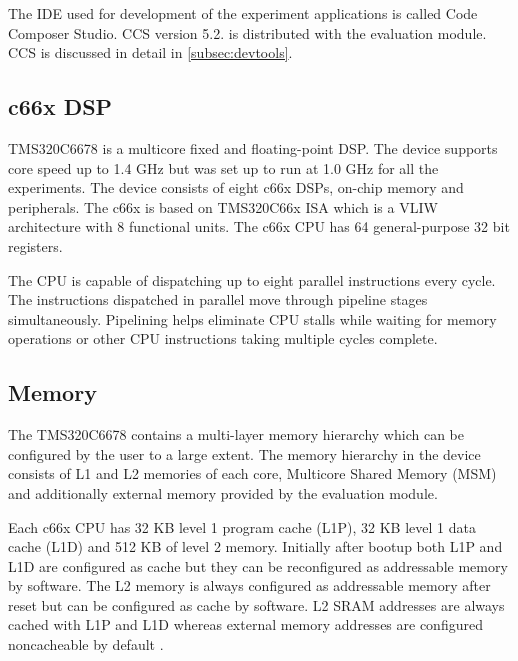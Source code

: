 The IDE used for development of the experiment applications is called Code Composer Studio. CCS version 5.2. is distributed with the evaluation module. CCS is discussed in detail in \ref{subsec:devtools}. 

\subsection{c66x DSP}
\label{subsec:c66x}
TMS320C6678 is a multicore fixed and floating-point DSP. The device supports core speed up to 1.4 GHz but was set up to run at 1.0 GHz for all the experiments. The device consists of eight c66x DSPs, on-chip memory and peripherals. The c66x is based on TMS320C66x ISA which is a VLIW architecture with 8 functional units. The c66x CPU has 64 general-purpose 32 bit registers. \cite{sprugh7} 

The CPU is capable of dispatching up to eight parallel instructions every cycle. The instructions dispatched in parallel move through pipeline stages simultaneously. Pipelining helps eliminate CPU stalls while waiting for memory operations or other CPU instructions taking multiple cycles complete. \cite{sprugh7} 

\subsection{Memory}
\label{subsec:c66memory}


The TMS320C6678 contains a multi-layer memory hierarchy which can be configured by the user to a large extent. The memory hierarchy in the device consists of L1 and L2 memories of each core, Multicore Shared Memory (MSM) and additionally external memory provided by the evaluation module.

Each c66x CPU has 32 KB level 1 program cache (L1P), 32 KB level 1 data cache (L1D) and 512 KB of level 2 memory. Initially after bootup both L1P and L1D are configured as cache but they can be reconfigured as addressable memory by software. The L2 memory is always configured as addressable memory after reset but can be configured as cache by software. \cite{tmsdatasheet} L2 SRAM addresses are always cached with L1P and L1D whereas external memory addresses are configured noncacheable by default \cite{cacheguide}.

